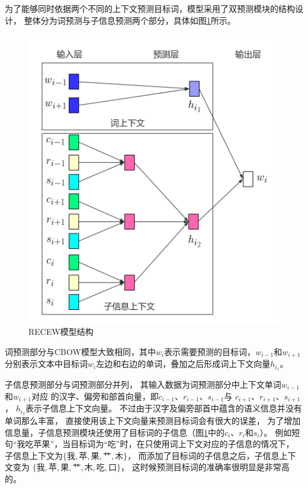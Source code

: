 为了能够同时依据两个不同的上下文预测目标词，模型采用了双预测模块的结构设计，
整体分为词预测与子信息预测两个部分，具体如图\ref{RECWE}所示。
\begin{figure}[h]
    \includegraphics[scale=0.4]{picture/RECWE.png}
    \caption{RECEW模型结构}
    \label{RECWE}
\end{figure}

词预测部分与CBOW模型大致相同，其中$w_i$表示需要预测的目标词，$w_{i-1}$和$w_{i+1}$
分别表示文本中目标词$w_i$左边和右边的单词，叠加之后形成词上下文向量$h_{i_1}$。

子信息预测部分与词预测部分并列，
其输入数据为词预测部分中上下文单词$w_{i-1}$和$w_{i+1}$对应
的汉字、偏旁和部首向量，即$c_{i-1}$、$r_{i-1}$、$s_{i-1}$与
$c_{i+1}$、$r_{i+1}$、$s_{i+1}$，
$h_{i_2}$表示子信息上下文向量。
不过由于汉字及偏旁部首中蕴含的语义信息并没有单词那么丰富，
直接使用该上下文向量来预测目标词会有很大的误差，
为了增加信息量，子信息预测模块还使用了目标词的子信息（图\ref{RECWE}中的$c_{i}$、$r_{i}$和$s_{i}$）。
例如短句“我吃苹果”，当目标词为“吃”时，在只使用词上下文对应的子信息的情况下，
子信息上下文为$\{\mbox{我},\mbox{苹},\mbox{果},\mbox{艹},\mbox{木}\}$，
而添加了目标词的子信息之后，子信息上下文变为
$\{\mbox{我},\mbox{苹},\mbox{果},\mbox{艹},\mbox{木},\mbox{吃},\mbox{口}\}$，
这时候预测目标词的准确率很明显是非常高的。

